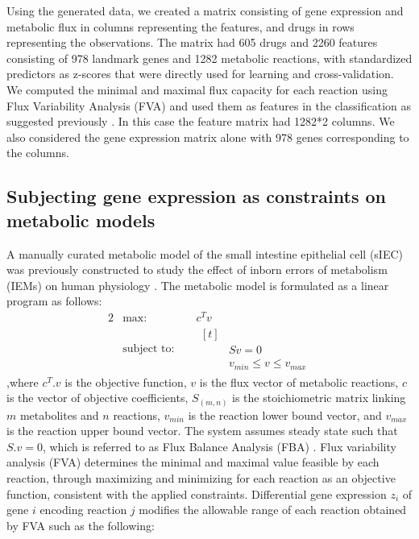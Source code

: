 Using the generated data, we created a matrix consisting of gene expression and metabolic flux in columns representing the features, and drugs in rows representing the observations. The matrix had 605 drugs and 2260 features consisting of 978 landmark genes and 1282 metabolic reactions, with standardized predictors as z-scores that were directly used for learning and cross-validation. 
We computed the minimal and maximal flux capacity for each reaction using Flux Variability Analysis (FVA) and used them as features in the classification as suggested previously \cite{shaked2016metabolic}. In this case the feature matrix had 1282*2 columns. We also considered the gene expression matrix alone with 978 genes corresponding to the columns.
\subsection{Subjecting gene expression as constraints on metabolic models} \label{se:constraints}
A manually curated metabolic model of the small intestine epithelial cell (sIEC) was previously constructed to study the effect of inborn errors of metabolism (IEMs) on human physiology \cite{sahoo2013predicting}. The metabolic model is formulated as a linear program as follows:
\begin{alignat}{2} 
  & \text{max: } &  & c^{T}v
  \label{se:eq1}\\
  & \text{subject to: } &  &  \nonumber
                \begin{aligned}[t] \\
                & Sv=0 \\
                & v_{min} \leq v  \leq  v_{max}
                \end{aligned}
  \nonumber
\end{alignat}
,where $c^{T}.v$ is the objective function, $v$ is the flux vector of metabolic reactions, $c$ is the vector of objective coefficients, $S_{(m,n)}$ is the stoichiometric matrix linking $m$ metabolites and $n$ reactions, $v_{min}$ is the reaction lower bound vector, and $v_{max}$ is the reaction upper bound vector. The system assumes steady state such that $S.v=0$, which is referred to as Flux Balance Analysis (FBA)\cite{orth2010flux} . Flux variability analysis (FVA) \cite{mahadevan2003effects} determines the minimal and maximal value feasible by each reaction, through maximizing and minimizing for each reaction as an objective function, consistent with the applied constraints.
Differential gene expression $z_i$ of gene $i$ encoding reaction $j$ modifies the allowable range of each reaction obtained by FVA such as the following:
